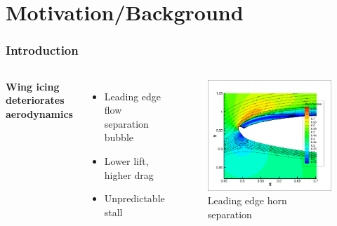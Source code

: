 \documentclass[9pt]{beamer}
\begin{document}
\section{Motivation/Background}
\label{sec-1}
\begin{frame}
\frametitle{Introduction}
\label{sec-1-1}

\begin{columns}[c]
    \centering
    {\bf Wing icing deteriorates aerodynamics}
    \begin{itemize}
      \item{Leading edge flow separation bubble}
      \item{Lower lift, higher drag}
      \item{Unpredictable stall}
    \end{itemize}
    \vspace*{-0.0cm}\begin{figure}
    \includegraphics[width=1\textwidth]{BadHorn.png}
    \caption{Leading edge horn separation}
    \end{figure}
  \end{columns}
\end{frame}
\end{document}
